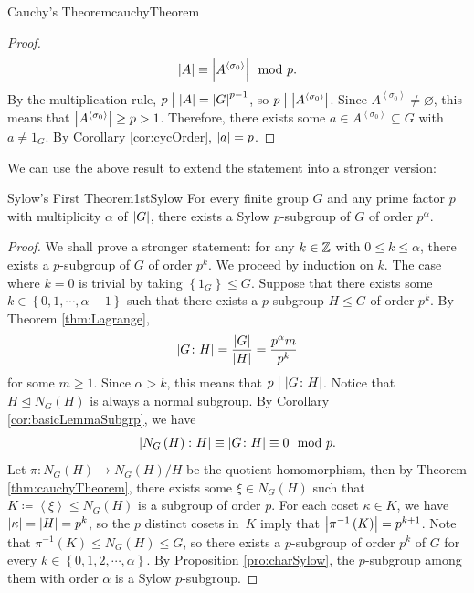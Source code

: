 \documentclass[math]{amznotes}
\theoremstyle{remark}
\newcommand{\0}{\mathbf{0}}
\newcommand{\1}{\mathbf{1}}
\begin{document}
\begin{thmbox}{Cauchy's Theorem}{cauchyTheorem}
\begin{proof}
        \begin{equation*}
            {\left\lvert {A} \right\rvert} \equiv {\left\lvert {A^{\left\langle\sigma_0\right\rangle}} \right\rvert} \mod p.
        \end{equation*}
        By the multiplication rule, $p \bigm\vert {\left\lvert {A} \right\rvert} = {\left\lvert {G} \right\rvert}^{p - 1}$, so $p \bigm\vert {\left\lvert {A^{\left\langle\sigma_0\right\rangle}} \right\rvert}$. Since $A^{\left\langle\sigma_0\right\rangle} \neq \varnothing$, this means that ${\left\lvert {A^{\left\langle\sigma_0\right\rangle}} \right\rvert} \geq p > 1$. Therefore, there exists some $a \in A^{\left\langle\sigma_0\right\rangle} \subseteq G$ with $a \neq 1_G$. By Corollary \ref{cor:cycOrder}, ${\left\lvert {a} \right\rvert} = p$.
    \end{proof}
\end{thmbox}
We can use the above result to extend the statement into a stronger version:
\begin{thmbox}{Sylow's First Theorem}{1stSylow}
    For every finite group $G$ and any prime factor $p$ with multiplicity $\alpha$ of ${\left\lvert {G} \right\rvert}$, there exists a Sylow $p$-subgroup of $G$ of order $p^{\alpha}$.
    \tcblower
    \begin{proof}
        We shall prove a stronger statement: for any $k \in \mathbb{Z}$ with $0 \leq k \leq \alpha$, there exists a $p$-subgroup of $G$ of order $p^k$. We proceed by induction on $k$. The case where $k = 0$ is trivial by taking $\left\{1_G\right\} \leq G$. Suppose that there exists some $k \in \left\{0, 1, \cdots, \alpha - 1\right\}$ such that there exists a $p$-subgroup $H \leq G$ of order $p^k$. By Theorem \ref{thm:Lagrange}, 
        \begin{equation*}
            {\left\lvert {G \colon H} \right\rvert} = \frac{{\left\lvert {G} \right\rvert}}{{\left\lvert {H} \right\rvert}} = \frac{p^{\alpha}m}{p^k}
        \end{equation*}
        for some $m \geq 1$. Since $\alpha > k$, this means that $p \bigm \vert {\left\lvert {G \colon H} \right\rvert}$. Notice that $H \trianglelefteq N_G\left(H\right)$ is always a normal subgroup. By Corollary \ref{cor:basicLemmaSubgrp}, we have 
        \begin{equation*}
            {\left\lvert {N_G\left(H\right) \colon H} \right\rvert} \equiv {\left\lvert {G \colon H} \right\rvert} \equiv 0 \mod p.
        \end{equation*}
        Let $\pi \colon N_G\left(H\right) \to N_G\left(H\right) \slash H$ be the quotient homomorphism, then by Theorem \ref{thm:cauchyTheorem}, there exists some $\xi \in N_G\left(H\right)$ such that $K \coloneqq \left\langle\xi\right\rangle \leq N_G\left(H\right)$ is a subgroup of order $p$. For each coset $\kappa \in K$, we have ${\left\lvert {\kappa} \right\rvert} = {\left\lvert {H} \right\rvert} = p^k$, so the $p$ distinct cosets in~$K$ imply that ${\left\lvert {\pi^{-1}\left(K\right)} \right\rvert} = p^{k + 1}$. Note that $\pi^{-1}\left(K\right) \leq N_G\left(H\right) \leq G$, so there exists a $p$-subgroup of order $p^k$ of $G$ for every $k \in \left\{0, 1, 2, \cdots, \alpha\right\}$. By Proposition \ref{pro:charSylow}, the $p$-subgroup among them with order $\alpha$ is a Sylow $p$-subgroup.
    \end{proof}
\end{thmbox}
\end{document}
